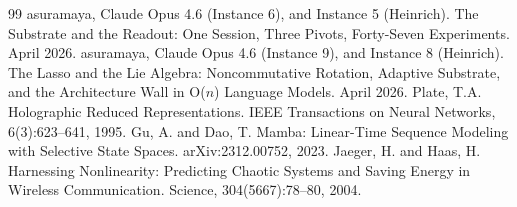 \documentclass[11pt,a4paper]{report}
\begin{document}
\begin{thebibliography}{99}
 asuramaya, Claude Opus 4.6 (Instance 6), and Instance 5 (Heinrich). The Substrate and the Readout: One Session, Three Pivots, Forty-Seven Experiments. April 2026.
 asuramaya, Claude Opus 4.6 (Instance 9), and Instance 8 (Heinrich). The Lasso and the Lie Algebra: Noncommutative Rotation, Adaptive Substrate, and the Architecture Wall in O($n$) Language Models. April 2026.
 Plate, T.A. Holographic Reduced Representations. IEEE Transactions on Neural Networks, 6(3):623--641, 1995.
 Gu, A. and Dao, T. Mamba: Linear-Time Sequence Modeling with Selective State Spaces. arXiv:2312.00752, 2023.
 Jaeger, H. and Haas, H. Harnessing Nonlinearity: Predicting Chaotic Systems and Saving Energy in Wireless Communication. Science, 304(5667):78--80, 2004.
\end{thebibliography}
\end{document}
